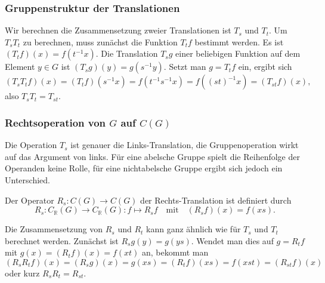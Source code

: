 %
%
\subsubsection{Gruppenstruktur der Translationen}
Wir berechnen die Zusammensetzung zweier Translationen ist $T_s$ und $T_t$.
Um $T_sT_t$ zu berechnen, muss zunächst die Funktion $T_tf$ bestimmt werden.
Es ist $(T_tf)(x) = f(t^{-1}x)$.
Die Translation $T_sg$ einer beliebigen Funktion auf dem Element $y\in G$
ist $(T_sg)(y)=g(s^{-1}y)$.
Setzt man $g=T_tf$ ein, ergibt sich
\[
(T_sT_tf)(x)
=
(T_tf)(s^{-1}x)
=
f(t^{-1}s^{-1}x)
=
f((st)^{-1}x)
=
(T_{st}f)(x),
\]
also $T_sT_t=T_{st}$.

%
%
\subsubsection{Rechtsoperation von $G$ auf $C(G)$}
Die Operation $T_s$ ist genauer die Links-Translation, die Gruppenoperation
wirkt auf das Argument von links.
Für eine abelsche Gruppe spielt die Reihenfolge der Operanden keine
Rolle, für eine nichtabelsche Gruppe ergibt sich jedoch ein Unterschied.

\begin{definition}
Der Operator $R_s\colon C(G)\to C(G)$ der Rechts-Translation ist definiert
durch
\[
R_s
\colon
C_{\mathbb{R}}(G)\to C_{\mathbb{R}}(G)
:
f \mapsto R_sf
\quad\text{mit}\quad
(R_sf)(x) = f(xs).
\]
\end{definition}

Die Zusammensetzung von $R_s$ und $R_t$ kann ganz ähnlich wie für
$T_s$ und $T_t$ berechnet werden.
Zunächst ist $R_sg(y) = g(ys)$.
Wendet man dies auf $g=R_tf$ mit $g(x)=(R_tf)(x)=f(xt)$ an, bekommt man
\[
(R_sR_tf)(x)
=
(R_sg)(x)
=
g(xs)
=
(R_tf)(xs)
=
f(xst)
=
(R_{st}f)(x)
\]
oder kurz $R_sR_t=R_{st}$.




